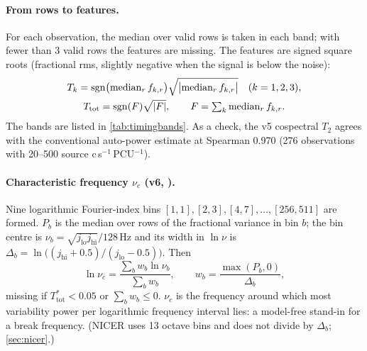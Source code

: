 \paragraph{From rows to features.} For each observation, the median over valid rows is taken in each band; with fewer than 3
valid rows the features are missing. The features are signed square roots (fractional rms, slightly negative when the
signal is below the noise):
\begin{equation}
\begin{gathered}
T_k=\operatorname{sgn}\bigl(\operatorname{median}_rf_{k,r}\bigr)\sqrt{\bigl|\operatorname{median}_rf_{k,r}\bigr|}\quad(k=1,2,3),\\
T_\mathrm{tot}=\operatorname{sgn}(F)\sqrt{|F|},\qquad F=\textstyle\sum_k\operatorname{median}_rf_{k,r}.
\end{gathered}\label{eq:signedsqrt}
\end{equation}
The bands are listed in \cref{tab:timingbands}. As a check, the v5 cospectral $T_2$ agrees with the conventional auto-power
estimate at Spearman 0.970 (276 observations with 20--500 source c\,s$^{-1}$\,PCU$^{-1}$).

\paragraph{Characteristic frequency $\nu_c$ (v6, ).} Nine logarithmic Fourier-index bins
$[1,1],[2,3],[4,7],\dots,[256,511]$ are formed. $P_b$ is the median over rows of the fractional variance in bin $b$; the bin
centre is $\nu_b=\sqrt{j_\mathrm{lo}j_\mathrm{hi}}/128$\,Hz and its width in $\ln\nu$ is
$\Delta_b=\ln\bigl((j_\mathrm{hi}+0.5)/(j_\mathrm{lo}-0.5)\bigr)$. Then
\begin{equation}
\ln\nu_c=\frac{\sum_bw_b\ln\nu_b}{\sum_bw_b},\qquad w_b=\frac{\max(P_b,0)}{\Delta_b},\label{eq:nuc}
\end{equation}
missing if $T^\ast_\mathrm{tot}<0.05$ or $\sum_bw_b\le0$. $\nu_c$ is the frequency around which most variability power per
logarithmic frequency interval lies: a model-free stand-in for a break frequency. (NICER uses 13 octave bins and does not
divide by $\Delta_b$; \cref{sec:nicer}.)

